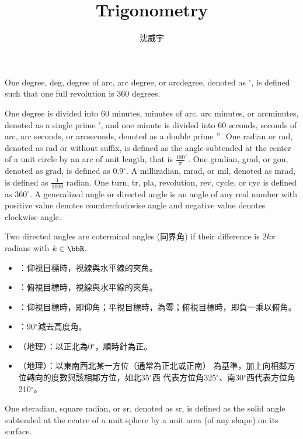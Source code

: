 \documentclass[a4paper,12pt]{report}
\begin{document}
\title{Trigonometry}
\author{沈威宇}
\date{\temtoday}
\titletocdoc
{}

One degree, deg, degree of arc, arc degree, or arcdegree, denoted as $^\circ$, is defined such that one full revolution is 360 degrees.

One degree is divided into 60 minutes, minutes of arc, arc minutes, or arcminutes, denoted as a single prime $'$, and one minute is divided into 60 seconds, seconds of arc, arc seconds, or arcseconds, denoted as a double prime $"$.
One radian or rad, denoted as rad or without suffix, is defined as the angle subtended at the center of a unit circle by an arc of unit length, that is $\frac{180}{\pi}^\circ$.
One gradian, grad, or gon, denoted as grad, is defined as $0.9^\circ$.
A milliradian, mrad, or mil, denoted as mrad, is defined as $\frac{1}{1000}$ radian.
One turn, tr, pla, revolution, rev, cycle, or cyc is defined as $360^\circ$.
A generalized angle or directed angle is an angle of any real number with positive value denotes counterclockwise angle and negative value denotes clockwise angle.

Two directed angles are coterminal angles (同界角) if their difference is $2k\pi$ radians with $k\in\bbR$.
\begin{itemize}
\item {}：仰視目標時，視線與水平線的夾角。
\item {}：俯視目標時，視線與水平線的夾角。
\item {}：仰視目標時，即仰角；平視目標時，為零；俯視目標時，即負一乘以俯角。
\item {}：90$^{\circ}$減去高度角。
\item {}（地理）：以正北為0$^\circ$，順時針為正。
\item {}（地理）：以東南西北某一方位（通常為正北或正南） 為基準，加上向相鄰方位轉向的度數與該相鄰方位，如北35$^\circ$西 代表方位角325$^\circ$、南30$^\circ$西代表方位角210$^\circ$。
\end{itemize}
One steradian, square radian, or sr, denoted as sr, is defined as the solid angle subtended at the centre of a unit sphere by a unit area (of any shape) on its surface.
\end{document}
